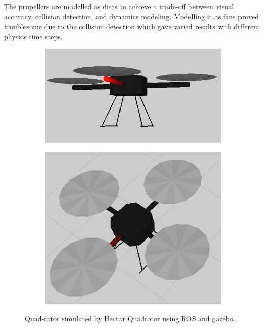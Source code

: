 \documentclass[hidelinks,BTech]{iitmdiss}
\begin{document}
The propellers are modelled as discs to achieve a trade-off between visual accuracy, collision detection, and dynamics modeling. Modelling it as fans proved troublesome due to the collision detection which gave varied results with different physics time steps.

\begin{figure}[H]
  \centering
    \begin{subfigure}[c]{0.45\textwidth}
      \centering
        \includegraphics[width=\textwidth]{quadrotor_sim.png}
    \end{subfigure}
    \begin{subfigure}[c]{0.45\textwidth}
      \centering
        \includegraphics[width=\textwidth]{quadrotor_sim2.png}
    \end{subfigure}
    \caption{Quad-rotor simulated by Hector Quadrotor using ROS and gazebo.}
\end{figure}
\end{document}
